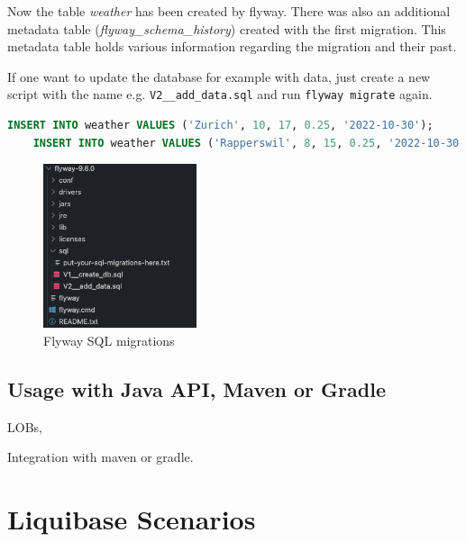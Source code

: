 Now the table \textit{weather} has been created by flyway. There was also an additional metadata table (\textit{flyway\_schema\_history}) created with the first migration. This metadata table holds various information regarding the migration and their past.

If one want to update the database for example with data, just create a new script with the name e.g. \texttt{V2\_\_add\_data.sql} and run  \texttt{flyway migrate} again.

\begin{lstlisting}[language=SQL, caption=Create a database]
	INSERT INTO weather VALUES ('Zurich', 10, 17, 0.25, '2022-10-30');
	INSERT INTO weather VALUES ('Rapperswil', 8, 15, 0.25, '2022-10-30');
\end{lstlisting}

\begin{figure}[H]
	\centering
	\includegraphics[width=0.4\textwidth]{./chapters/intro_flyway/images/flyway_v2_sql_migrations}
	\caption[Flyway SQL migrations - Source: Own illustration]{Flyway SQL migrations}
	\label{fig:flyway_sql_scripts}
\end{figure}





\subsection{Usage with Java API, Maven or Gradle}
%
LOBs,

%
Integration with maven or gradle.


\section{Liquibase Scenarios}



\newpage
